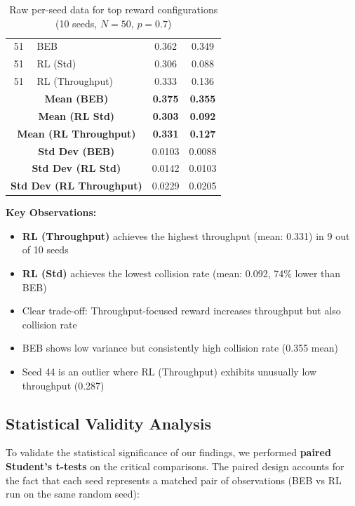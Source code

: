 \documentclass[12pt,a4paper,oneside]{article}
\theoremstyle{definition}
\begin{document}
\begin{table}[H]
\begin{tabular}{|c|l|c|c|}
        \hline
        51 & BEB & 0.362 & 0.349 \\
        51 & RL (Std) & 0.306 & 0.088 \\
        51 & RL (Throughput) & 0.333 & 0.136 \\
        \hline
        \multicolumn{2}{|c|}{\textbf{Mean (BEB)}} & \textbf{0.375} & \textbf{0.355} \\
        \multicolumn{2}{|c|}{\textbf{Mean (RL Std)}} & \textbf{0.303} & \textbf{0.092} \\
        \multicolumn{2}{|c|}{\textbf{Mean (RL Throughput)}} & \textbf{0.331} & \textbf{0.127} \\
        \hline
        \multicolumn{2}{|c|}{\textbf{Std Dev (BEB)}} & 0.0103 & 0.0088 \\
        \multicolumn{2}{|c|}{\textbf{Std Dev (RL Std)}} & 0.0142 & 0.0103 \\
        \multicolumn{2}{|c|}{\textbf{Std Dev (RL Throughput)}} & 0.0229 & 0.0205 \\
        \hline
    \end{tabular}
    \caption{Raw per-seed data for top reward configurations (10 seeds, $N=50$, $p=0.7$)}
    \label{tab:raw_reward_top3}
\end{table}

\textbf{Key Observations:}
\begin{itemize}
    \item \textbf{RL (Throughput)} achieves the highest throughput (mean: 0.331) in 9 out of 10 seeds
    \item \textbf{RL (Std)} achieves the lowest collision rate (mean: 0.092, 74\% lower than BEB)
    \item Clear trade-off: Throughput-focused reward increases throughput but also collision rate
    \item BEB shows low variance but consistently high collision rate (0.355 mean)
    \item Seed 44 is an outlier where RL (Throughput) exhibits unusually low throughput (0.287)
\end{itemize}

\subsection{Statistical Validity Analysis}

To validate the statistical significance of our findings, we performed \textbf{paired Student's t-tests} on the critical comparisons. The paired design accounts for the fact that each seed represents a matched pair of observations (BEB vs RL run on the same random seed):
\end{document}
